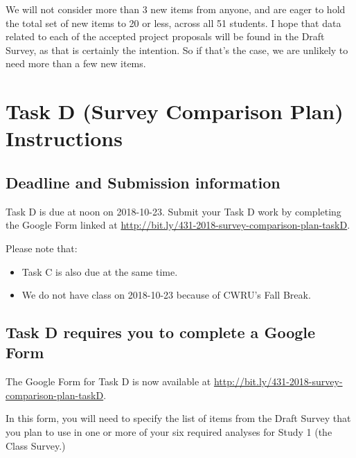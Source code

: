 \documentclass[]{book}
\providecommand{\tightlist}{%
  \setlength{\itemsep}{0pt}\setlength{\parskip}{0pt}}
\theoremstyle{definition}
\theoremstyle{definition}
\theoremstyle{definition}
\theoremstyle{remark}
\begin{document}
We will not consider more than 3 new items from anyone, and are eager to
hold the total set of new items to 20 or less, across all 51 students. I
hope that data related to each of the accepted project proposals will be
found in the Draft Survey, as that is certainly the intention. So if
that's the case, we are unlikely to need more than a few new items.

\hypertarget{taskD}{%
\chapter{Task D (Survey Comparison Plan) Instructions}\label{taskD}}

\hypertarget{deadline-and-submission-information-3}{%
\section{Deadline and Submission
information}\label{deadline-and-submission-information-3}}

Task D is due at noon on 2018-10-23. Submit your Task D work by
completing the Google Form linked at
\url{http://bit.ly/431-2018-survey-comparison-plan-taskD}.

Please note that:

\begin{itemize}
\tightlist
\item
  Task C is also due at the same time.
\item
  We do not have class on 2018-10-23 because of CWRU's Fall Break.
\end{itemize}

\hypertarget{task-d-requires-you-to-complete-a-google-form}{%
\section{Task D requires you to complete a Google
Form}\label{task-d-requires-you-to-complete-a-google-form}}

The Google Form for Task D is now available at
\url{http://bit.ly/431-2018-survey-comparison-plan-taskD}.

In this form, you will need to specify the list of items from the Draft
Survey that you plan to use in one or more of your six required analyses
for Study 1 (the Class Survey.)
\end{document}

